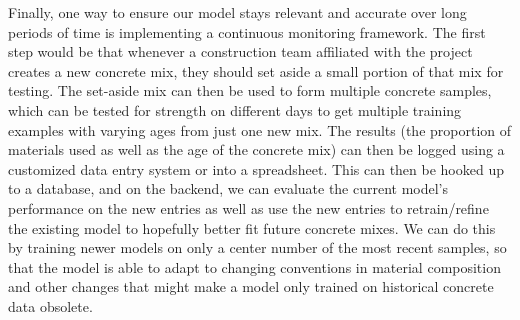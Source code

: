 \documentclass[12pt,letterpaper]{article}
\begin{document}
Finally, one way to ensure our model stays relevant and accurate over long periods of time is implementing a continuous monitoring framework. The first step would be that whenever a construction team affiliated with the project creates a new concrete mix, they should set aside a small portion of that mix for testing. The set-aside mix can then be used to form multiple concrete samples, which can be tested for strength on different days to get multiple training examples with varying ages from just one new mix. The results (the proportion of materials used as well as the age of the concrete mix) can then be logged using a customized data entry system or into a spreadsheet. This can then be hooked up to a database, and on the backend, we can evaluate the current model’s performance on the new entries as well as use the new entries to retrain/refine the existing model to hopefully better fit future concrete mixes. We can do this by training newer models on only a center number of the most recent samples, so that the model is able to adapt to changing conventions in material composition and other changes that might make a model only trained on historical concrete data obsolete.
\end{document}
